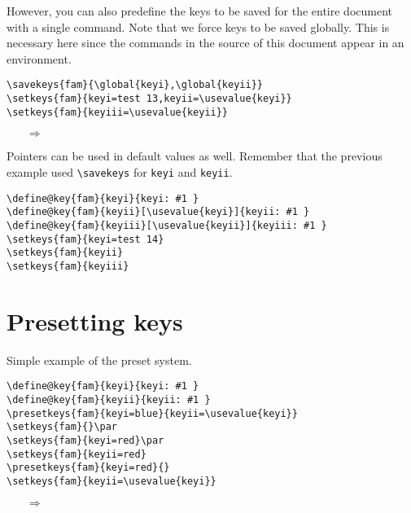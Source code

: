 \documentclass{article}
\begin{document}
However, you can also predefine the keys to be saved for the entire
document with a single command. Note that we force keys to be saved
globally. This is necessary here since the commands in the source of
this document appear in an environment.
\begin{verbatim}
\savekeys{fam}{\global{keyi},\global{keyii}}
\setkeys{fam}{keyi=test 13,keyii=\usevalue{keyi}}
\setkeys{fam}{keyiii=\usevalue{keyii}}
\end{verbatim}
\begin{itemize}
\item[$\Rightarrow$]
\end{itemize}

Pointers can be used in default values as well. Remember that the
previous example used \verb+\savekeys+ for \verb+keyi+ and \verb+keyii+.
\begin{verbatim}
\define@key{fam}{keyi}{keyi: #1 }
\define@key{fam}{keyii}[\usevalue{keyi}]{keyii: #1 }
\define@key{fam}{keyiii}[\usevalue{keyii}]{keyiii: #1 }
\setkeys{fam}{keyi=test 14}
\setkeys{fam}{keyii}
\setkeys{fam}{keyiii}
\end{verbatim}

\section{Presetting keys}

Simple example of the preset system.
\begin{verbatim}
\define@key{fam}{keyi}{keyi: #1 }
\define@key{fam}{keyii}{keyii: #1 }
\presetkeys{fam}{keyi=blue}{keyii=\usevalue{keyi}}
\setkeys{fam}{}\par
\setkeys{fam}{keyi=red}\par
\setkeys{fam}{keyii=red}
\presetkeys{fam}{keyi=red}{}
\setkeys{fam}{keyii=\usevalue{keyi}}
\end{verbatim}
\begin{itemize}
\item[$\Rightarrow$]
\par
{}\par
{}
\par
{}
\end{itemize}
\end{document}
